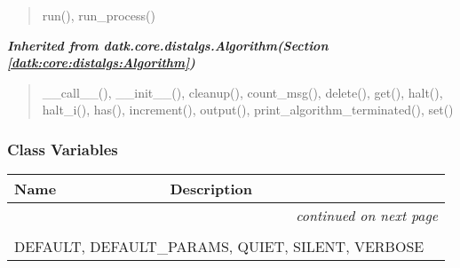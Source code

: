 \begin{quote}
run(), run\_process()
\end{quote}

\large{\textbf{\textit{Inherited from datk.core.distalgs.Algorithm\textit{(Section \ref{datk:core:distalgs:Algorithm})}}}}

\begin{quote}
\_\_call\_\_(), \_\_init\_\_(), cleanup(), count\_msg(), delete(), get(), halt(), halt\_i(), has(), increment(), output(), print\_algorithm\_terminated(), set()
\end{quote}


  \subsubsection{Class Variables}

    \vspace{-1cm}
\hspace{\varindent}\begin{longtable}{|p{\varnamewidth}|p{\vardescrwidth}|l}
\cline{1-2}
\cline{1-2} \centering \textbf{Name} & \centering \textbf{Description}& \\
\cline{1-2}
\endhead\cline{1-2}\multicolumn{3}{r}{\small\textit{continued on next page}}\\\endfoot\cline{1-2}
\endlastfoot\multicolumn{2}{|l|}{\textit{Inherited from datk.core.distalgs.Algorithm \textit{(Section \ref{datk:core:distalgs:Algorithm})}}}\\
\multicolumn{2}{|p{\varwidth}|}{\raggedright DEFAULT, DEFAULT\_PARAMS, QUIET, SILENT, VERBOSE}\\
\cline{1-2}
\end{longtable}



